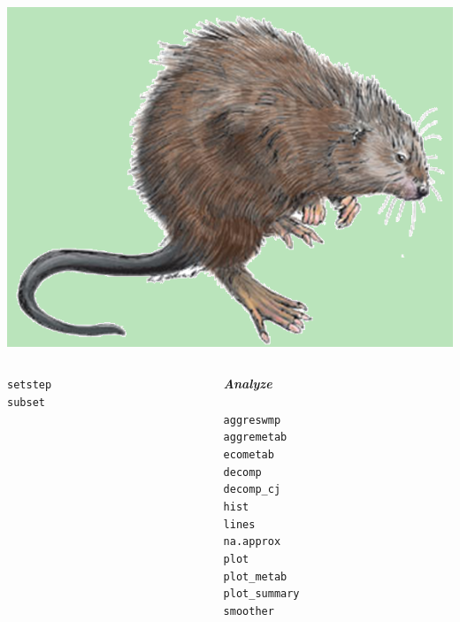\documentclass[serif]{beamer}\usepackage[]{graphicx}\usepackage[]{color}
\newcommand{\Bigtxt}[1]{\textbf{\textit{#1}}}
\begin{document}
\begin{frame}[fragile]{\includegraphics[width=0.05\paperwidth]{fig/muskrat.png}\hspace{0.07in}{\bf SWMPrats.net: The SWMPr package}}
\begin{columns}[t]
\begin{column}{0.3\textwidth}
\begin{center}
{\texttt{setstep}\\
\texttt{subset}
}
\end{center}
\end{column}
\begin{column}{0.3\textwidth}
\begin{center}
\Bigtxt{Analyze}\\~\\
\small{
\texttt{aggreswmp}\\
\texttt{aggremetab}\\
\texttt{ecometab}\\
\texttt{decomp}\\
\texttt{decomp\_cj}\\
\texttt{hist}\\
\texttt{lines}\\
\texttt{na.approx}\\
\texttt{plot}\\
\texttt{plot\_metab}\\
\texttt{plot\_summary}\\
\texttt{smoother}
}
\end{center}
\end{column}
\end{columns}
\end{frame}
\end{document}
